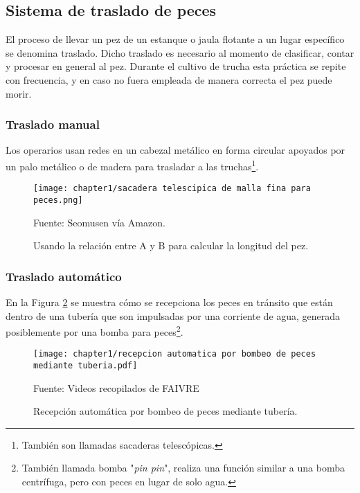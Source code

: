 \subsection{Sistema de traslado de peces}

El proceso de llevar un pez de un estanque o jaula flotante a un lugar específico se denomina traslado. Dicho traslado es necesario al momento de clasificar, contar y procesar en general al pez. Durante el cultivo de trucha esta práctica se repite con frecuencia, y en caso no fuera empleada de manera correcta el pez puede morir.

\subsubsection{Traslado manual}

Los operarios usan redes en un cabezal metálico en forma circular apoyados por un palo metálico o de madera para trasladar a las truchas\footnote{También son llamadas sacaderas telescópicas.}.

\begin{figure}[H]
	\centering
	\texttt{[image: chapter1/sacadera telescipica de malla fina para peces.png]}
	\caption{Usando la relación  entre A y B para calcular la longitud del pez.}
	Fuente: Seomusen vía Amazon.
	\label{fig:sacadera telescipica de malla fina para peces}
\end{figure}

\subsubsection{Traslado automático}

En la Figura \ref{fig:recepcion automatica por bombeo de peces mediante tuberia} se muestra cómo se recepciona los peces en tránsito que están dentro de una tubería que son impulsadas por una corriente de agua, generada posiblemente por una bomba para peces\footnote{También llamada bomba "\textit{pin pin}", realiza una función similar a una bomba centrífuga, pero con peces en lugar de solo agua.}.

\begin{figure}[H]
	\centering
	\texttt{[image: chapter1/recepcion automatica por bombeo de peces mediante tuberia.pdf]}
	\caption{Recepción automática por bombeo de peces mediante tubería.}
	Fuente: Videos recopilados de FAIVRE
	\label{fig:recepcion automatica por bombeo de peces mediante tuberia}
\end{figure}

